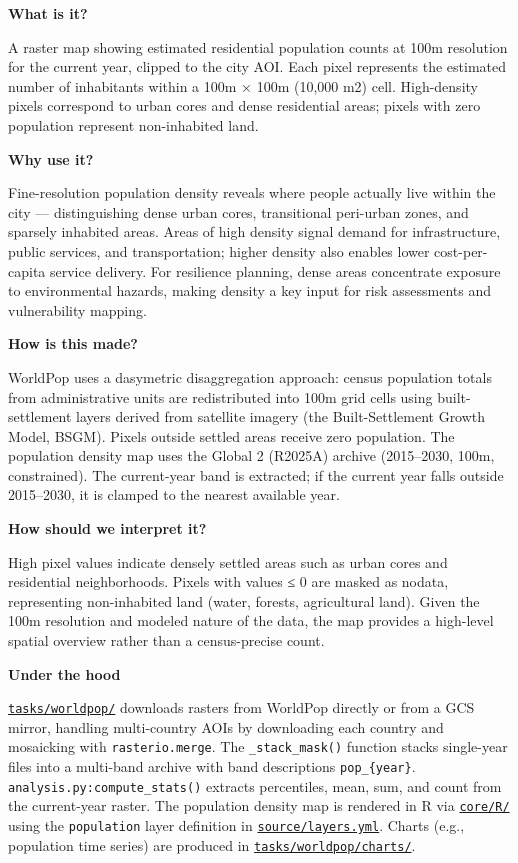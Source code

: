 \documentclass[
  letterpaper,
  DIV=11,
  numbers=noendperiod]{scrreprt}
\begin{document}
\textbf{What is it?}

A raster map showing estimated residential population counts at 100m
resolution for the current year, clipped to the city AOI. Each pixel
represents the estimated number of inhabitants within a 100m × 100m
(10,000 m2) cell. High-density pixels correspond to urban cores and
dense residential areas; pixels with zero population represent
non-inhabited land.

\textbf{Why use it?}

Fine-resolution population density reveals where people actually live
within the city --- distinguishing dense urban cores, transitional
peri-urban zones, and sparsely inhabited areas. Areas of high density
signal demand for infrastructure, public services, and transportation;
higher density also enables lower cost-per-capita service delivery. For
resilience planning, dense areas concentrate exposure to environmental
hazards, making density a key input for risk assessments and
vulnerability mapping.

\textbf{How is this made?}

WorldPop uses a dasymetric disaggregation approach: census population
totals from administrative units are redistributed into 100m grid cells
using built-settlement layers derived from satellite imagery (the
Built-Settlement Growth Model, BSGM). Pixels outside settled areas
receive zero population. The population density map uses the Global 2
(R2025A) archive (2015--2030, 100m, constrained). The current-year band
is extracted; if the current year falls outside 2015--2030, it is
clamped to the nearest available year.

\textbf{How should we interpret it?}

High pixel values indicate densely settled areas such as urban cores and
residential neighborhoods. Pixels with values ≤ 0 are masked as nodata,
representing non-inhabited land (water, forests, agricultural land).
Given the 100m resolution and modeled nature of the data, the map
provides a high-level spatial overview rather than a census-precise
count.

\textbf{Under the hood}

\href{../tasks/worldpop/}{\texttt{tasks/worldpop/}} downloads rasters
from WorldPop directly or from a GCS mirror, handling multi-country AOIs
by downloading each country and mosaicking with \texttt{rasterio.merge}.
The \texttt{\_stack\_mask()} function stacks single-year files into a
multi-band archive with band descriptions \texttt{pop\_\{year\}}.
\texttt{analysis.py:compute\_stats()} extracts percentiles, mean, sum,
and count from the current-year raster. The population density map is
rendered in R via \href{../core/R/}{\texttt{core/R/}} using the
\texttt{population} layer definition in
\href{../source/layers.yml}{\texttt{source/layers.yml}}. Charts (e.g.,
population time series) are produced in
\href{../tasks/worldpop/charts/}{\texttt{tasks/worldpop/charts/}}.
\end{document}
